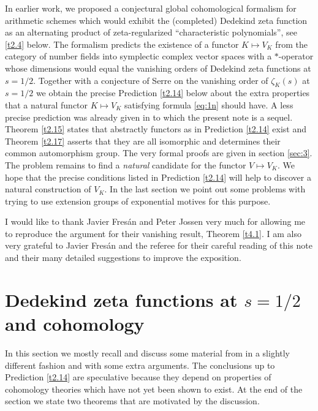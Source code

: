 \documentclass[12pt,leqno]{article}
\begin{document}
In earlier work, we proposed a conjectural global cohomological formalism for arithmetic schemes which would exhibit the (completed) Dedekind zeta function as an alternating product of zeta-regularized ``characteristic polynomials'', see \ref{t2.4} below. The formalism predicts the existence of a functor $K \mapsto V_K$ from the category of number fields into symplectic complex vector spaces with a $*$-operator whose dimensions would equal the vanishing orders of Dedekind zeta functions at $s = 1/2$. Together with a conjecture of Serre on the vanishing order of $\zeta_K (s)$ at $s = 1/2$ we obtain the precise Prediction \ref{t2.14} below about the extra properties that a natural functor $K \mapsto V_K$ satisfying formula \eqref{eq:1n} should have. A less precise prediction was already given in \cite{D2} to which the present note is a sequel. \\
Theorem \ref{t2.15} states that abstractly functors as in Prediction \ref{t2.14} exist and Theorem \ref{t2.17} asserts that they are all isomorphic and determines their common automorphism group. The very formal proofs are given in section \ref{sec:3}. The problem remains to find a \textit{natural} candidate for the functor $V \mapsto V_K$. We hope that the precise conditions listed in Prediction \ref{t2.14} will help to discover a natural construction of $V_K$. In the last section we point out some problems with trying to use extension groups of exponential motives for this purpose. 

I would like to thank Javier Fres\'an and Peter Jossen very much for allowing me to reproduce the argument for their vanishing result, Theorem \ref{t4.1}. I am also very grateful to Javier Fres\'an and the referee for their careful reading of this note and their many detailed suggestions to improve the exposition. 
%
\section{Dedekind zeta functions at $s = 1 / 2$ and cohomology} \label{sec:2}

In this section we mostly recall and discuss some material from \cite{D2} in a slightly different fashion and with some extra arguments. The conclusions up to Prediction \ref{t2.14} are speculative because they depend on properties of cohomology theories which have not yet been shown to exist. At the end of the section we state two theorems that are motivated by the discussion.
\end{document}
